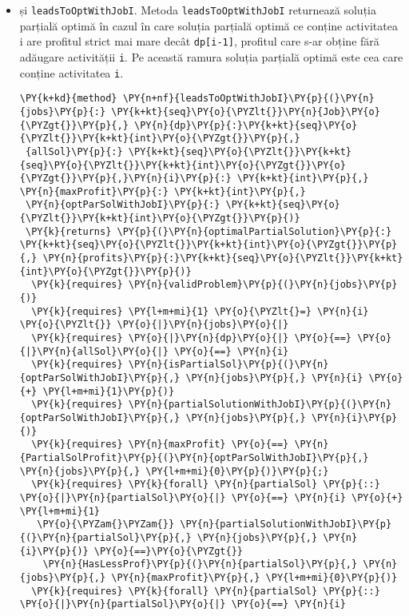\begin{itemize}
    
    \item și \texttt{leadsToOptWithJobI}. Metoda \texttt{leadsToOptWithJobI} returnează soluția parțială optimă în cazul în care soluția parțială optimă ce conține activitatea i
    are profitul strict mai mare decât \texttt{dp[i-1]}, profitul care s-ar obține fără adăugare activității \texttt{i}. Pe această ramura soluția parțială optimă este cea care conține activitatea \texttt{i}.
\begin{Verbatim}[commandchars=\\\{\}, fontsize=\footnotesize]
\PY{k+kd}{method} \PY{n+nf}{leadsToOptWithJobI}\PY{p}{(}\PY{n}{jobs}\PY{p}{:} \PY{k+kt}{seq}\PY{o}{\PYZlt{}}\PY{n}{Job}\PY{o}{\PYZgt{}}\PY{p}{,} \PY{n}{dp}\PY{p}{:}\PY{k+kt}{seq}\PY{o}{\PYZlt{}}\PY{k+kt}{int}\PY{o}{\PYZgt{}}\PY{p}{,}
 {allSol}\PY{p}{:} \PY{k+kt}{seq}\PY{o}{\PYZlt{}}\PY{k+kt}{seq}\PY{o}{\PYZlt{}}\PY{k+kt}{int}\PY{o}{\PYZgt{}}\PY{o}{\PYZgt{}}\PY{p}{,}\PY{n}{i}\PY{p}{:} \PY{k+kt}{int}\PY{p}{,} \PY{n}{maxProfit}\PY{p}{:} \PY{k+kt}{int}\PY{p}{,} 
 \PY{n}{optParSolWithJobI}\PY{p}{:} \PY{k+kt}{seq}\PY{o}{\PYZlt{}}\PY{k+kt}{int}\PY{o}{\PYZgt{}}\PY{p}{)} 
 \PY{k}{returns} \PY{p}{(}\PY{n}{optimalPartialSolution}\PY{p}{:} \PY{k+kt}{seq}\PY{o}{\PYZlt{}}\PY{k+kt}{int}\PY{o}{\PYZgt{}}\PY{p}{,} \PY{n}{profits}\PY{p}{:}\PY{k+kt}{seq}\PY{o}{\PYZlt{}}\PY{k+kt}{int}\PY{o}{\PYZgt{}}\PY{p}{)}
  \PY{k}{requires} \PY{n}{validProblem}\PY{p}{(}\PY{n}{jobs}\PY{p}{)}
  \PY{k}{requires} \PY{l+m+mi}{1} \PY{o}{\PYZlt{}=} \PY{n}{i} \PY{o}{\PYZlt{}} \PY{o}{|}\PY{n}{jobs}\PY{o}{|}
  \PY{k}{requires} \PY{o}{|}\PY{n}{dp}\PY{o}{|} \PY{o}{==} \PY{o}{|}\PY{n}{allSol}\PY{o}{|} \PY{o}{==} \PY{n}{i}
  \PY{k}{requires} \PY{n}{isPartialSol}\PY{p}{(}\PY{n}{optParSolWithJobI}\PY{p}{,} \PY{n}{jobs}\PY{p}{,} \PY{n}{i} \PY{o}{+} \PY{l+m+mi}{1}\PY{p}{)}
  \PY{k}{requires} \PY{n}{partialSolutionWithJobI}\PY{p}{(}\PY{n}{optParSolWithJobI}\PY{p}{,} \PY{n}{jobs}\PY{p}{,} \PY{n}{i}\PY{p}{)}
  \PY{k}{requires} \PY{n}{maxProfit} \PY{o}{==} \PY{n}{PartialSolProfit}\PY{p}{(}\PY{n}{optParSolWithJobI}\PY{p}{,} \PY{n}{jobs}\PY{p}{,} \PY{l+m+mi}{0}\PY{p}{)}\PY{p}{;}
  \PY{k}{requires} \PY{k}{forall} \PY{n}{partialSol} \PY{p}{::} \PY{o}{|}\PY{n}{partialSol}\PY{o}{|} \PY{o}{==} \PY{n}{i} \PY{o}{+} \PY{l+m+mi}{1} 
   \PY{o}{\PYZam{}\PYZam{}} \PY{n}{partialSolutionWithJobI}\PY{p}{(}\PY{n}{partialSol}\PY{p}{,} \PY{n}{jobs}\PY{p}{,} \PY{n}{i}\PY{p}{)} \PY{o}{==}\PY{o}{\PYZgt{}} 
    \PY{n}{HasLessProf}\PY{p}{(}\PY{n}{partialSol}\PY{p}{,} \PY{n}{jobs}\PY{p}{,} \PY{n}{maxProfit}\PY{p}{,} \PY{l+m+mi}{0}\PY{p}{)}
  \PY{k}{requires} \PY{k}{forall} \PY{n}{partialSol} \PY{p}{::} \PY{o}{|}\PY{n}{partialSol}\PY{o}{|} \PY{o}{==} \PY{n}{i}

\end{Verbatim}
\end{itemize}
